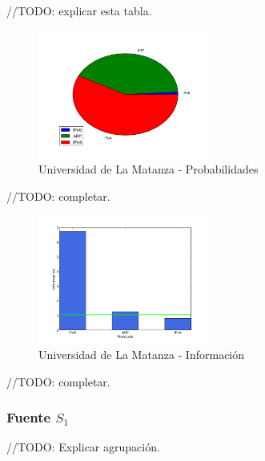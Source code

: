\documentclass[final,inline,narroweqnarray,a4paper]{ieee}
\begin{document}
//TODO: explicar esta tabla.

\begin{figure}[H]
    \begin{center}
        \includegraphics[width=0.5\textwidth]{plot/facultadS-pie.png}
        \caption{Universidad de La Matanza - Probabilidades}
        \label{torta:universidadLMS}
    \end{center}
\end{figure}

//TODO: completar.

\begin{figure}[H]
    \begin{center}
        \includegraphics[width=0.5\textwidth]{plot/facultadS-bar.png}
        \caption{Universidad de La Matanza - Información}
        \label{histo:universidadLMS}
    \end{center}
\end{figure}

//TODO: completar.

\subsubsection{Fuente $S_1$}

//TODO: Explicar agrupación.
\end{document}
